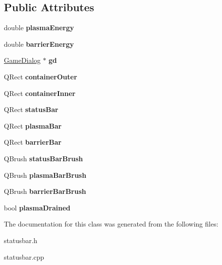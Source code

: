 \subsection*{Public Attributes}
\begin{DoxyCompactItemize}
\item 
\mbox{\label{classgame_1_1StatusBar_a7f689a9d2af31928c419676f7eb7574d}} 
double {\bfseries plasma\+Energy}
\item 
\mbox{\label{classgame_1_1StatusBar_a163659b0b66f80294b8e14630fa61f92}} 
double {\bfseries barrier\+Energy}
\item 
\mbox{\label{classgame_1_1StatusBar_af653577a3a51facb48406cc4d8be1bf7}} 
\hyperlink{classgame_1_1GameDialog}{Game\+Dialog} $\ast$ {\bfseries gd}
\item 
\mbox{\label{classgame_1_1StatusBar_aff1f3af82e8cc7acab25a2dcd138bc12}} 
Q\+Rect {\bfseries container\+Outer}
\item 
\mbox{\label{classgame_1_1StatusBar_a6aac9db1ee5c17fa560029c44bafef2f}} 
Q\+Rect {\bfseries container\+Inner}
\item 
\mbox{\label{classgame_1_1StatusBar_a913f4b61e040916ecc74b860ea6aae93}} 
Q\+Rect {\bfseries status\+Bar}
\item 
\mbox{\label{classgame_1_1StatusBar_a85e71cdf7723a28c0a074b8e175ec1be}} 
Q\+Rect {\bfseries plasma\+Bar}
\item 
\mbox{\label{classgame_1_1StatusBar_aa8b50fb06a6dd2d6b2dc6aa20bfece17}} 
Q\+Rect {\bfseries barrier\+Bar}
\item 
\mbox{\label{classgame_1_1StatusBar_a8ca76942546081a6b216750c593a45d5}} 
Q\+Brush {\bfseries status\+Bar\+Brush}
\item 
\mbox{\label{classgame_1_1StatusBar_acf54f4d846efa7057076fb2a943fef1d}} 
Q\+Brush {\bfseries plasma\+Bar\+Brush}
\item 
\mbox{\label{classgame_1_1StatusBar_a477e4348478dad3d4983b520c2184e19}} 
Q\+Brush {\bfseries barrier\+Bar\+Brush}
\item 
\mbox{\label{classgame_1_1StatusBar_afc97465ae693e902628a04cc7daf4562}} 
bool {\bfseries plasma\+Drained}
\end{DoxyCompactItemize}


The documentation for this class was generated from the following files\+:\begin{DoxyCompactItemize}
\item 
statusbar.\+h\item 
statusbar.\+cpp\end{DoxyCompactItemize}
